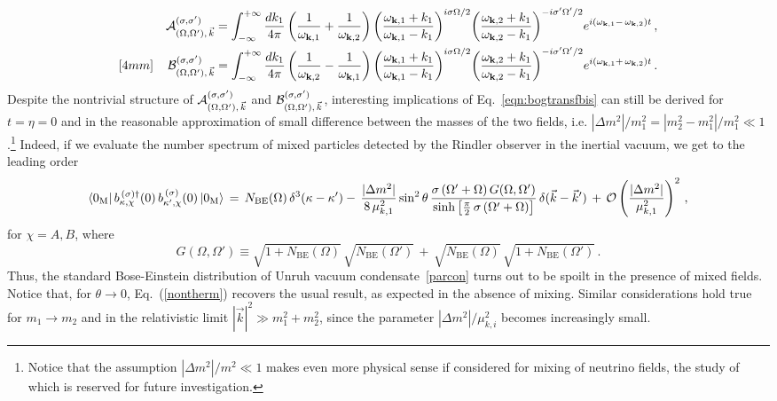 \documentclass[floats,prd,aps,amssymb,nofootinbib,showkeys]{revtex4}
\newcommand{\be}{\begin{equation}}\newcommand{\ee}{\end{equation}}
\def\lf{\left}\def\lrar{\leftrightarrow}
\def\ri{\right}\def\ti{\tilde}\def\we{\wedge}\def\wti{\widetilde}
\def\lf{\left}\def\lrar{\leftrightarrow}
\def\ri{\right}\def\ti{\tilde}
\def\we{\wedge}\def\wti{\widetilde}
\def\lf{\left}\def\lrar{\leftrightarrow}
\def\ri{\right}\def\ti{\tilde}
\def\we{\wedge}\def\wti{\widetilde}
\def\bogocoeffAlpha{{\cal A}_{(\Om,\Om'),\,\vec{k}}^{(\si,\si')}}
\def\bogocoeffBeta{{\cal B}_{(\Om,\Om'),\,\vec{k}}^{(\si,\si')}}
\begin{document}
\begin{eqnarray}
&& \bogocoeffAlpha =\int^{+\infty}_{-\infty}\frac{dk_1}{4\pi}\lf(\frac{1}{\omega_{\bk,1}}+\frac{1}{\omega_{\bk,2}}\ri){\lf(\frac{\omega_{\bk,1}+k_1}{\omega_{\bk,1}-k_1}\ri)}^{i\sigma\Omega/2} {\lf(\frac{\omega_{\bk,2}+k_1}{\omega_{\bk,2}-k_1}\ri)}^{-i\sigma'\Omega'/2}
e^{i(\omega_{\bk,1}-\,\omega_{\bk,2})t}\,,
\label{eqn:coefficientunobis}
\\ [4mm]
&& \bogocoeffBeta =\int^{+\infty}_{-\infty}\frac{dk_1}{4\pi}\lf(\frac{1}{\omega_{\bk,2}}
-\frac{1}{\omega_{\bk,1}}\ri){\lf(\frac{\omega_{\bk,1}+
k_1}{\omega_{\bk,1}-k_1}\ri)}^{i\sigma\Omega/2} {\lf(\frac{\omega_{\bk,2}+k_1}{\omega_{\bk,2}-k_1}\ri)}^{-i\sigma'\Omega'/2}
e^{i(\omega_{\bk,1}+\,\omega_{\bk,2})t}\,.
\label{eqn:coefficientduebis}
\end{eqnarray}
Despite the nontrivial structure of $\bogocoeffAlpha$
and $\bogocoeffBeta$, interesting implications of Eq.~\eqref{eqn:bogtransfbis} can still be derived for $t=\eta=0$
and in the reasonable approximation of small difference 
between the masses of the two fields, i.e. $|\Delta m^2|/{m_1^2}=|m_2^2-m_1^2|/m_1^2\ll 1$.\footnote{Notice that the assumption $|\Delta m^2|/m^2\ll 1$ makes even more physical sense if considered for mixing of neutrino fields, the study of which is reserved for future investigation.}
Indeed, if we evaluate the number spectrum of mixed particles detected by the Rindler observer in the inertial vacuum, we get to the leading order~\cite{Luciano}  
\be
\langle0_\mathrm{M}|\,b_{\kappa,\chi}^{\,(\sigma)\dagger}(0)\,
b_{\kappa',\chi}^{\,(\sigma)}(0)\,|0_\mathrm{M}\rangle\,
=\, N_{\mathrm{BE}}(\Omega)\,\delta^3(\kappa-\kappa')-\,\frac{|\Delta m^2|}{8\,\mu_{k,1}^{\hspace{0.1mm}2}}\sin^2\theta\,\frac{\sigma\,(\Omega'+\Omega)\,G(\Omega,\Omega')}{\sinh\left[\frac{\pi}{2}\,\sigma\,(\Omega'+\Omega)\right]}\,\delta(\vec{k}-\vec{k}')\,+\,\mathcal{O}\left(\frac{|\Delta m^2|}{\mu^2_{k,1}}\right)^2\,,
\label{nontherm}
\ee
for $\chi=A,B$, where
\be
G(\Omega,\Omega')\equiv\sqrt{1+N_{\mathrm{BE}}(\Omega)}\,\sqrt{N_\mathrm{BE}(\Omega')}\,+\,\sqrt{N_{\mathrm{BE}}(\Omega)}\,\sqrt{1+N_{\mathrm{BE}}(\Omega')}\,.
\label{eqn:G}
\ee
Thus, the standard Bose-Einstein distribution
of Unruh vacuum condensate~\eqref{parcon} 
turns out to be spoilt in the presence of 
mixed fields. Notice that, for $\theta\rightarrow 0$,  Eq.~(\ref{nontherm}) recovers the usual result, as expected in the absence of mixing. 
Similar considerations hold true for $m_1\rightarrow m_2$ and in the relativistic limit $|\vec{k}|^{2}\gg m_{1}^2+m_{2}^2$, since the parameter ${|\Delta m^2|}/{\mu^2_{k,i}}$ becomes increasingly small.
\end{document}

